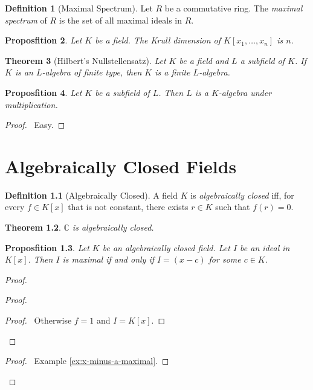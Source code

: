 \documentclass{book}
\let\qed\relax
\newtheorem{prop}{Proposfition}[chapter]
\newtheorem{thm}[prop]{Theorem}
\theoremstyle{definition}
\newtheorem{df}[prop]{Definition}
\begin{document}
\begin{df}[Maximal Spectrum]
Let $R$ be a commutative ring. The \emph{maximal spectrum} of $R$ is the set of all maximal ideals in $R$.
\end{df}

\begin{prop}
Let $K$ be a field. The Krull dimension of $K[x_1, \ldots, x_n]$ is $n$.
\end{prop}


\begin{thm}[Hilbert's Nullstellensatz]
Let $K$ be a field and $L$ a subfield of $K$. If $K$ is an $L$-algebra of finite type, then $K$ is a finite $L$-algebra.
\end{thm}


\begin{prop}
Let $K$ be a subfield of $L$. Then $L$ is a $K$-algebra under multiplication.
\end{prop}

\begin{proof}
\pf\ Easy. \qed
\end{proof}

\chapter{Algebraically Closed Fields}

\begin{df}[Algebraically Closed]
A field $K$ is \emph{algebraically closed} iff, for every $f \in K[x]$ that is not constant, there exists $r \in K$ such that $f(r) = 0$.
\end{df}

\begin{thm}
$\mathbb{C}$ is algebraically closed.
\end{thm}


\begin{prop}
Let $K$ be an algebraically closed field. Let $I$ be an ideal in $K[x]$. Then $I$ is maximal if and only if $I = (x-c)$ for some $c \in K$.
\end{prop}

\begin{proof}
\pf
{}
\begin{proof}
	\begin{proof}
		\pf\ Otherwise $f = 1$ and $I = K[x]$.
	\end{proof}
\end{proof}
\begin{proof}
	\pf\ Example \ref{ex:x-minus-a-maximal}.
\end{proof}
\qed
\end{proof}
\end{document}
